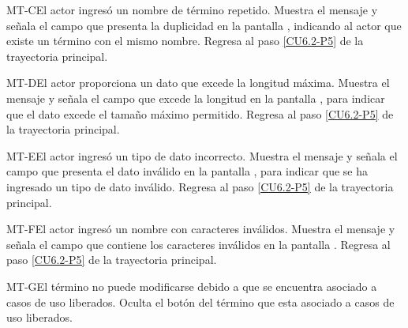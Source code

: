 	\begin{UCtrayectoriaA}{MT-C}{El actor ingresó un nombre de término repetido.}
		\UCpaso[\UCsist] Muestra el mensaje  y señala el campo que presenta la duplicidad en la pantalla , indicando al actor que existe un término con el mismo nombre.
		\UCpaso Regresa al paso \ref{CU6.2-P5} de la trayectoria principal.
	\end{UCtrayectoriaA}

	\begin{UCtrayectoriaA}{MT-D}{El actor proporciona un dato que excede la longitud máxima.}
		\UCpaso[\UCsist] Muestra el mensaje  y señala el campo que excede la longitud en la pantalla , para indicar que el dato excede el tamaño máximo permitido.
		\UCpaso Regresa al paso \ref{CU6.2-P5} de la trayectoria principal.
	\end{UCtrayectoriaA}

	\begin{UCtrayectoriaA}{MT-E}{El actor ingresó un tipo de dato incorrecto.}
		\UCpaso[\UCsist] Muestra el mensaje  y señala el campo que presenta el dato inválido en la pantalla , para indicar que se ha ingresado un tipo de dato inválido.
		\UCpaso Regresa al paso \ref{CU6.2-P5} de la trayectoria principal.
	\end{UCtrayectoriaA}

	\begin{UCtrayectoriaA}{MT-F}{El actor ingresó un nombre con caracteres inválidos.}
	\UCpaso[\UCsist] Muestra el mensaje  y señala el campo que contiene los caracteres inválidos en la pantalla .
	\UCpaso Regresa al paso \ref{CU6.2-P5} de la trayectoria principal.
	\end{UCtrayectoriaA}


	\begin{UCtrayectoriaA}{MT-G}{El término no puede modificarse debido a que se encuentra asociado a casos de uso liberados.}
		\UCpaso[\UCsist] Oculta el botón \editar del término que esta asociado a casos de uso liberados.
	\end{UCtrayectoriaA}
